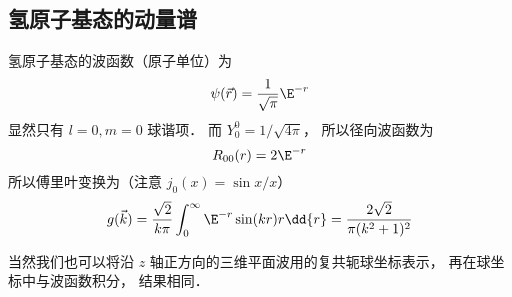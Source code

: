 \subsection{氢原子基态的动量谱}
氢原子基态的波函数（原子单位）为
\begin{equation}
\psi(\vec r) = \frac{1}{\sqrt\pi} \E^{-r}
\end{equation}
显然只有 $l = 0, m = 0$ 球谐项． 而 $Y_0^0 = 1/\sqrt{4\pi}$， 所以径向波函数为
\begin{equation}
R_{00}(r) = 2 \E^{-r}
\end{equation}
所以傅里叶变换为（注意 $j_0(x) = \sin x/x$）
\begin{equation}
g(\vec k) = \frac{\sqrt{2}}{k\pi} \int_0^\infty \E^{-r} \sin(kr) r \dd{r} = \frac{2\sqrt{2}}{\pi(k^2+1)^2}
\end{equation}

当然我们也可以将沿 $z$ 轴正方向的三维平面波用的复共轭球坐标表示， 再在球坐标中与波函数积分， 结果相同．
